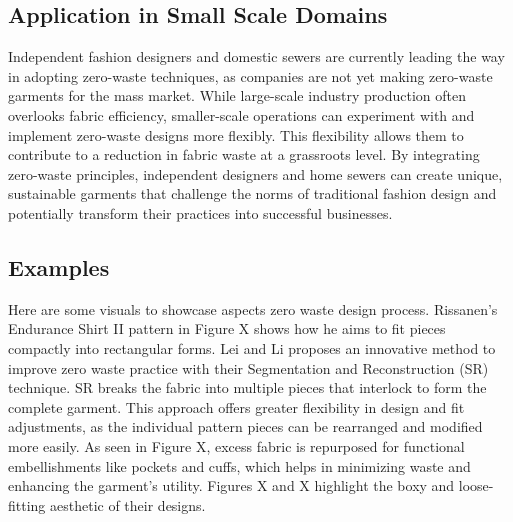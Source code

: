 \subsection{Application in Small Scale Domains}
Independent fashion designers and domestic sewers are currently leading the way in adopting zero-waste techniques, as companies are not yet making zero-waste garments for the mass market. While large-scale industry production often overlooks fabric efficiency, smaller-scale operations can experiment with and implement zero-waste designs more flexibly. This flexibility allows them to contribute to a reduction in fabric waste at a grassroots level. By integrating zero-waste principles, independent designers and home sewers can create unique, sustainable garments that challenge the norms of traditional fashion design and potentially transform their practices into successful businesses. 

\subsection{Examples}
Here are some visuals to showcase aspects zero waste design process. Rissanen's Endurance Shirt II pattern in Figure X shows how he aims to fit pieces compactly into rectangular forms. Lei and Li proposes an innovative method to improve zero waste practice with their Segmentation and Reconstruction (SR) technique. SR breaks the fabric into multiple pieces that interlock to form the complete garment. This approach offers greater flexibility in design and fit adjustments, as the individual pattern pieces can be rearranged and modified more easily. As seen in Figure X, excess fabric is repurposed for functional embellishments like pockets and cuffs, which helps in minimizing waste and enhancing the garment’s utility. Figures X and X highlight the boxy and loose-fitting aesthetic of their designs.

